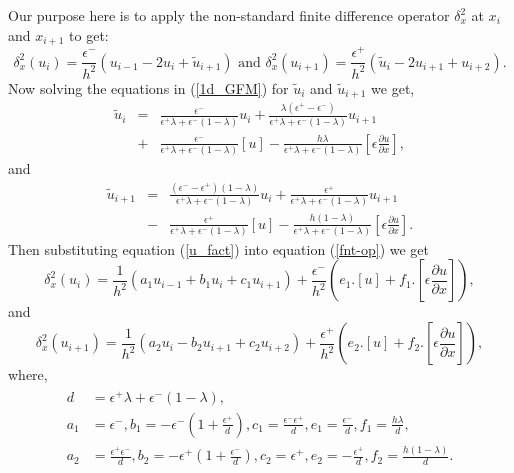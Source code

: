 Our purpose here is to apply the non-standard finite difference operator $\delta_x^2$ at $x_i$ and $x_{i+1}$ to get: 
\begin{equation}
\delta_x^2\left(u_{i}\right)= \frac{\epsilon^-}{h^2} \left(u_{i-1}-2u_{i}+\tilde{u}_{i+1}\right)\text{ and }\delta_x^2\left(u_{i+1}\right)= \frac{\epsilon^+}{h^2} \left(\tilde{u}_{i}-2u_{i+1}+u_{i+2}\right).	\label{fnt-op}
\end{equation}
Now solving the equations in (\ref{1d_GFM})  for $\tilde{u}_i $ and $\tilde{u}_{i+1}$ we get, 
\begin{eqnarray}	\tilde{u}_i&=& \frac{\epsilon^-}{\epsilon^+\lambda+\epsilon^-(1-\lambda)}u_i +\frac{\lambda(\epsilon^+-\epsilon^-)}{\epsilon^+\lambda+\epsilon^-(1-\lambda)}u_{i+1}\nonumber\\ &+&\frac{\epsilon^-}{\epsilon^+\lambda+\epsilon^-(1-\lambda)}\left[u\right] -\frac{h \lambda}{\epsilon^+\lambda+\epsilon^-(1-\lambda)}\left[ \epsilon \frac{\partial u}{\partial x} \right],
\end{eqnarray}
and 
\begin{eqnarray}		
	\tilde{u}_{i+1}&=& \frac{(\epsilon^--\epsilon^+)(1-\lambda)}{\epsilon^+\lambda+\epsilon^-(1-\lambda)} u_i +\frac{\epsilon^+}{\epsilon^+\lambda+\epsilon^-(1-\lambda)} u_{i+1}\nonumber \\
	&-&\frac{\epsilon^+}{\epsilon^+\lambda+\epsilon^-(1-\lambda)} \left[u\right] -\frac{h(1-\lambda)}{\epsilon^+\lambda+\epsilon^-(1-\lambda)}\left[ \epsilon \frac{\partial u}{\partial x} \right].\label{u_fact}
\end{eqnarray}
Then substituting equation (\ref{u_fact}) into equation (\ref{fnt-op}) we get
\begin{equation}
		\delta_x^2\left(u_{i}\right)= \frac{1}{h^2} \left(a_1u_{i-1}+b_1 u_{i}+c_1u_{i+1}\right)+\frac{\epsilon^-}{h^2}\left(e_1.[u]+f_1.\left[ \epsilon \frac{\partial u}{\partial x} \right]\right),\label{fnt-op-1}
\end{equation}
and 
\begin{equation}		
		\delta_x^2\left(u_{i+1}\right)= \frac{1}{h^2} \left(a_2u_{i}-b_2u_{i+1}+c_2u_{i+2}\right)+\frac{\epsilon^+}{h^2}\left(e_2.[u]+f_2.\left[ \epsilon \frac{\partial u}{\partial x} \right]\right),\label{fnt-op-2}
\end{equation}
where,
\begin{eqnarray}
\begin{aligned}
d&=\epsilon^+\lambda+\epsilon^-(1-\lambda),\\
a_1&= \epsilon^-,b_1=-\epsilon^-\left(1+\frac{\epsilon^+}{d}\right), c_1=\frac{\epsilon^-\epsilon^+}{d}, e_1=\frac{\epsilon^-}{d},f_1=\frac{h\lambda}{d},\\
a_2&= \frac{\epsilon^+\epsilon^-}{d},b_2=-\epsilon^+\left(1+\frac{\epsilon^-}{d}\right), c_2=\epsilon^+, e_2=-\frac{\epsilon^+}{d},f_2=\frac{h(1-\lambda)}{d}.
\end{aligned}
\end{eqnarray}
